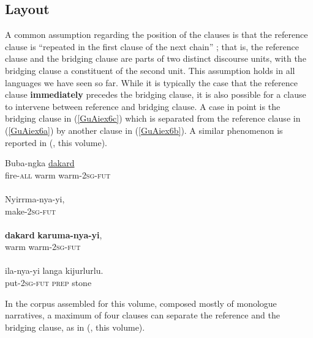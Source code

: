 \documentclass[output=paper]{LSP/langsci}
\begin{document}
\subsection{Layout}
\label{GuAi2.1layout}
A common assumption regarding the position of the clauses is that the reference clause is ``repeated in the first clause of the next chain'' \citep[][363]{devries.2005}; that is, the reference clause and the bridging clause are parts of two distinct discourse units, with the bridging clause a constituent of the second unit. This assumption holds in all languages we have seen so far. While it is typically the case that the reference clause \textbf{immediately} precedes the bridging clause, it is also possible for a clause to intervene between reference and bridging clause. A case in point is the bridging clause in (\ref{GuAiex6c}) which is separated from the reference clause in (\ref{GuAiex6a}) by another clause in (\ref{GuAiex6b}). A similar phenomenon is reported in  (\citeauthor{devries18}, this volume).

\begin{exe}
	\ex	\label{GuAiex6ad}
 {\citealt[][]{Pensalfini}}
\begin{xlist}
\ex	\label{GuAiex6a}
\gll		Buba-ngka   \underline{dakard}     \underline{} \\
			fire-\textsc{all}   warm     warm-\textsc{2sg-fut}\\
		\glt	{} \\
\ex	\label{GuAiex6b}
\gll		Nyirrma-nya-yi, \\
			make-\textsc{2sg-fut} \\
		\glt	{} \\
\ex	\label{GuAiex6c}
\gll		\textbf{dakard}   \textbf{karuma-nya-yi},  \\
			warm    warm-\textsc{2sg-fut}\\
		\glt	{} \\
\ex	\label{GuAiex6d}
\gll ila-nya-yi   langa   kijurlurlu.\\
put-\textsc{2sg-fut}   \textsc{prep}   stone\\
		\glt	{} 
		\end{xlist}
\end{exe}



In the corpus assembled for this volume, composed mostly of monologue narratives, a maximum of four clauses can separate the reference and the bridging clause, as in  (\citeauthor{jarkey18}, this volume). 
\end{document}
